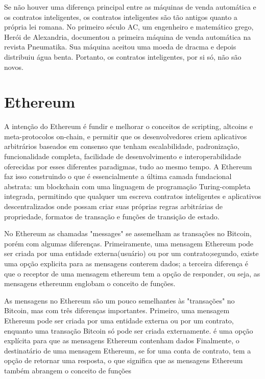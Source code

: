         Se não houver uma diferença principal entre as máquinas de venda automática e os contratos inteligentes, os contratos inteligentes são tão antigos quanto a própria lei romana. No primeiro século AC, um engenheiro e matemático grego, Herói de Alexandria, documentou a primeira máquina de venda automática na revista Pneumatika. Sua máquina aceitou uma moeda de dracma e depois distribuiu água benta. Portanto, os contratos inteligentes, por si só, não são novos.\cite{blockchain_pratical_guide}
        

        \cite{bitcoin_and_blockchainsecurity}


\section{Ethereum}



A intenção do Ethereum é fundir e melhorar o conceitos de scripting, altcoins e meta-protocolos on-chain, e permitir que os desenvolvedores criem aplicativos arbitrários baseados em consenso que tenham escalabilidade, padronização, funcionalidade completa, facilidade de desenvolvimento e interoperabilidade oferecidas por esses diferentes paradigmas, tudo ao mesmo tempo. A Ethereum faz isso construindo o que é essencialmente a última camada fundacional abstrata: um blockchain com uma linguagem de programação Turing-completa integrada, permitindo que qualquer um escreva contratos inteligentes e aplicativos descentralizados onde possam criar suas próprias regras arbitrárias de propriedade, formatos de transação e funções de transição de estado.\cite{ethereum_white_paper}


No Ethereum as chamadas "messages" se assemelham as transações no Bitcoin, porém com algumas diferenças. Primeiramente, uma mensagem Ethereum pode ser criada por uma entidade externa(usuário) ou por um contrato;segundo, existe uma opção explicita para as mensagens conterem dados; a terceira diferença é que o receptor de uma mensagem ethereum tem a opção de responder, ou seja, as mensagens ethereunm englobam o conceito de funções.\cite{ethereum_white_paper}


As mensagens no Ethereum são um pouco semelhantes às "transações" no Bitcoin, mas com três diferenças importantes. Primeiro, uma mensagem Ethereum pode ser criada por uma entidade externa ou por um contrato, enquanto uma transação Bitcoin só pode ser criada externamente. é uma opção explícita para que as mensagens Ethereum contenham dados Finalmente, o destinatário de uma mensagem Ethereum, se for uma conta de contrato, tem a opção de retornar uma resposta, o que significa que as mensagens Ethereum também abrangem o conceito de funções\cite{ethereum_white_paper}



